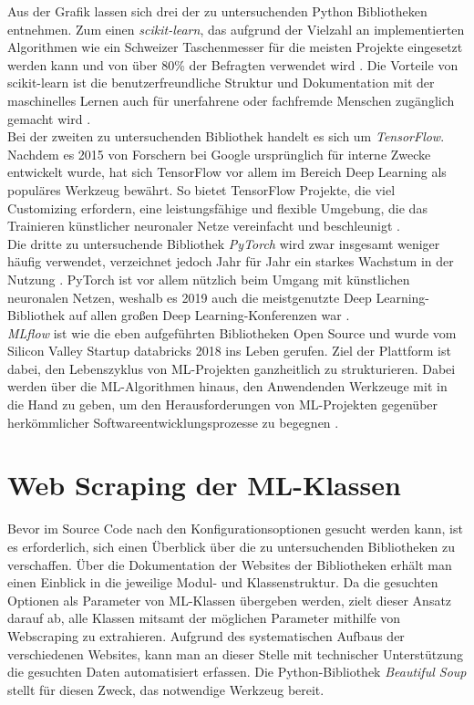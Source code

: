 \documentclass[german,bachelor]{swsLeipzig}
\begin{document}
Aus der Grafik lassen sich drei der zu untersuchenden Python Bibliotheken entnehmen.
Zum einen \textit{scikit-learn}, das aufgrund der Vielzahl an implementierten Algorithmen wie ein \glqq Schweizer Taschenmesser\grqq{}
für die meisten Projekte eingesetzt werden kann und von über 80\% der Befragten verwendet wird \cite[]{kaggle}.
Die Vorteile von scikit-learn ist die benutzerfreundliche Struktur und Dokumentation mit der maschinelles Lernen
auch für unerfahrene oder fachfremde Menschen zugänglich gemacht wird \cite[]{10.1145/2786984.2786995}.\\

Bei der zweiten zu untersuchenden Bibliothek handelt es sich um \textit{TensorFlow}.
Nachdem es 2015 von Forschern bei Google ursprünglich für interne Zwecke entwickelt wurde, hat sich TensorFlow vor allem im Bereich
Deep Learning als populäres Werkzeug bewährt.
So bietet TensorFlow Projekte, die viel Customizing erfordern, eine leistungsfähige und flexible Umgebung, die das Trainieren
künstlicher neuronaler Netze vereinfacht und beschleunigt \cite[]{doi:10.3102/1076998619872761}.\\

Die dritte zu untersuchende Bibliothek \textit{PyTorch} wird zwar insgesamt weniger häufig verwendet, verzeichnet
jedoch Jahr für Jahr ein starkes Wachstum in der Nutzung \cite[]{kaggle}.
PyTorch ist vor allem nützlich beim Umgang mit künstlichen neuronalen Netzen, weshalb es 2019 auch die
meistgenutzte Deep Learning-Bibliothek auf allen großen Deep Learning-Konferenzen war \cite[]{2020}.\\

\textit{MLflow} ist wie die eben aufgeführten Bibliotheken Open Source und wurde vom Silicon Valley Startup databricks 2018 ins Leben gerufen.
Ziel der Plattform ist dabei, den Lebenszyklus von ML-Projekten ganzheitlich zu strukturieren.
Dabei werden über die ML-Algorithmen hinaus, den Anwendenden Werkzeuge mit in die Hand zu geben, um den Herausforderungen
von ML-Projekten gegenüber herkömmlicher Softwareentwicklungsprozesse zu begegnen \cite[]{zaharia2018accelerating}.\\


\section{Web Scraping der ML-Klassen}\label{scrape}
Bevor im Source Code nach den Konfigurationsoptionen gesucht werden kann, ist es erforderlich, sich einen Überblick über
die zu untersuchenden Bibliotheken zu verschaffen.
Über die Dokumentation der Websites der Bibliotheken erhält man einen Einblick in die jeweilige Modul- und Klassenstruktur.
Da die gesuchten Optionen als Parameter von ML-Klassen übergeben werden, zielt dieser Ansatz darauf ab, alle Klassen
mitsamt der möglichen Parameter mithilfe von Webscraping zu extrahieren.
Aufgrund des systematischen Aufbaus der verschiedenen Websites, kann man an dieser Stelle mit technischer Unterstützung
die gesuchten Daten automatisiert erfassen.
Die Python-Bibliothek \textit{Beautiful Soup} stellt für diesen Zweck, das notwendige Werkzeug bereit.\\
\end{document}
